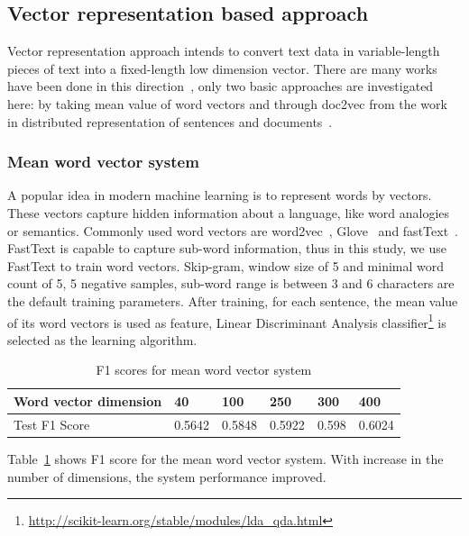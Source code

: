 \documentclass[11pt]{article}
\begin{document}
\subsection{Vector representation based approach}

Vector representation approach intends to convert text data in variable-length pieces of text into a fixed-length low dimension vector. There are many works have been done in this direction~\cite{2014arXiv1408.5882K,2015arXiv151108198W,Kusner2015From,Kenter2016Siamese,Ye2017Determining}, only two basic approaches are investigated here: by taking mean value of word vectors and through doc2vec from the work in distributed representation of sentences and documents~\cite{Le2014Distributed}. 

\subsubsection{Mean word vector system}
A popular idea in modern machine learning is to represent words by vectors. These vectors capture hidden information about a language, like word analogies or semantics. Commonly used word vectors are word2vec~\cite{Mikolov2013Distributed}, Glove~\cite{Pennington2014Glove} and fastText~\cite{bojanowski2017enriching}. FastText is capable to capture sub-word information, thus in this study, we use FastText to train word vectors. Skip-gram, window size of 5 and minimal word count of 5, 5 negative samples, sub-word range is between 3 and 6 characters are the default training parameters. After training, for each sentence, the mean value of its word vectors is used as feature, Linear Discriminant Analysis classifier\footnote{\url{http://scikit-learn.org/stable/modules/lda_qda.html}} is selected as the learning algorithm.

\begin{table}[h]
	\centering
	
	
	\begin{tabular}{|l|l|l|l|l|l|}
		\hline
		Word vector dimension & 40 & 100 & 250 & 300 & 400 \\ \hline
		Test F1 Score & 0.5642 & 0.5848 & 0.5922 & 0.598 & 0.6024 \\ \hline
	\end{tabular}
	\caption{F1 scores for mean word vector system}
	\label{word2vec}
\end{table}

Table~\ref{word2vec} shows F1 score for the mean word vector system. With increase in the number of dimensions, the system performance improved.\label{vectorsize} %
\end{document}
